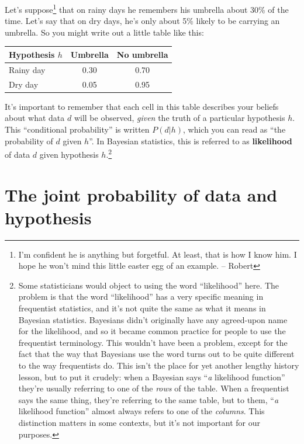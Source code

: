 \documentclass[
  11pt,
  a4paper,
  twoside,symmetric,openright]{book}
\theoremstyle{break}
\theoremstyle{break}
\begin{document}
Let's suppose\footnote{I'm confident he is anything but forgetful. At least, that is how I know him. I hope he won't mind this little easter egg of an example. -- Robert} that on rainy days he remembers his umbrella about 30\% of the time. Let's say that on dry days, he's only about 5\% likely to be carrying an umbrella. So you might write out a little table like this:

\begin{longtable}[]{@{}lcc@{}}
\toprule\noalign{}
Hypothesis \(h\) & Umbrella & No umbrella \\
\midrule\noalign{}
\endhead
\bottomrule\noalign{}
\endlastfoot
Rainy day & 0.30 & 0.70 \\
Dry day & 0.05 & 0.95 \\
\end{longtable}

It's important to remember that each cell in this table describes your beliefs about what data \(d\) will be observed, \emph{given} the truth of a particular hypothesis \(h\). This ``conditional probability'' is written \(P(d|h)\), which you can read as ``the probability of \(d\) given \(h\)''. In Bayesian statistics, this is referred to as \textbf{likelihood} of data \(d\) given hypothesis \(h\).\footnote{Some statisticians would object to using the word ``likelihood'' here. The problem is that the word ``likelihood'' has a very specific meaning in frequentist statistics, and it's not quite the same as what it means in Bayesian statistics. Bayesians didn't originally have any agreed-upon name for the likelihood, and so it became common practice for people to use the frequentist terminology. This wouldn't have been a problem, except for the fact that the way that Bayesians use the word turns out to be quite different to the way frequentists do. This isn't the place for yet another lengthy history lesson, but to put it crudely: when a Bayesian says ``\emph{a} likelihood function'' they're usually referring to one of the \emph{rows} of the table. When a frequentist says the same thing, they're referring to the same table, but to them, ``\emph{a} likelihood function'' almost always refers to one of the \emph{columns}. This distinction matters in some contexts, but it's not important for our purposes.}

\section{The joint probability of data and hypothesis}\label{the-joint-probability-of-data-and-hypothesis}
\end{document}
